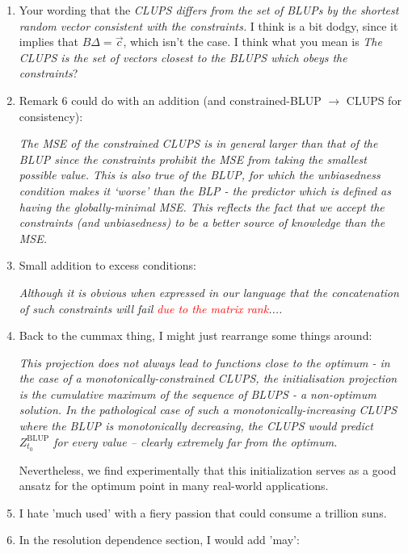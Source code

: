 \documentclass[]{article}
\begin{document}
\begin{enumerate}
			\item Your wording that the {\it CLUPS differs from the set of BLUPs by the shortest random vector consistent with the constraints.} I think is a bit dodgy, since it implies that $ B \Delta = \vec{c}$, which isn't the case. I think what you mean is {\it The CLUPS is the set of vectors closest to the BLUPS which obeys the constraints}?
			\item Remark 6 could do with an addition (and constrained-BLUP $\to$ CLUPS for consistency):
			
			{\it The MSE of the constrained CLUPS is in general larger than that of the BLUP since the constraints prohibit the MSE from taking the smallest possible value. {\color{red}This is also true of the BLUP, for which the unbiasedness condition makes it `worse' than the BLP - the predictor which is defined as having the globally-minimal MSE}. This reflects the fact that we accept the constraints {\color{red} (and unbiasedness)} to be a better source of knowledge than the MSE.}
			
			\item Small addition to excess conditions:
			
			{\it Although it is obvious when expressed in our language that the concatenation of such constraints will fail \textcolor{red}{due to the matrix rank}....}

			\item Back to the cummax thing, I might just rearrange some things around:
			
			{\it {\color{red}This projection does not always lead to functions close to the optimum - in the case of a monotonically-constrained CLUPS, the initialisation projection is the cumulative maximum of the sequence of BLUPS - a non-optimum solution. In the pathological case of such a monotonically-increasing CLUPS where the BLUP is monotonically \textit{decreasing}, the CLUPS would predict $Z_{t_0}^\text{BLUP}$ for every value -- clearly extremely far from the optimum.}
			
			Nevertheless, we find experimentally that this initialization serves as a good ansatz for the optimum point in many real-world applications.}
			
			\item I hate 'much used' with a fiery passion that could consume a trillion suns.	
			
			\item In the resolution dependence section, I would add 'may': 
			

\end{enumerate}
\end{document}
